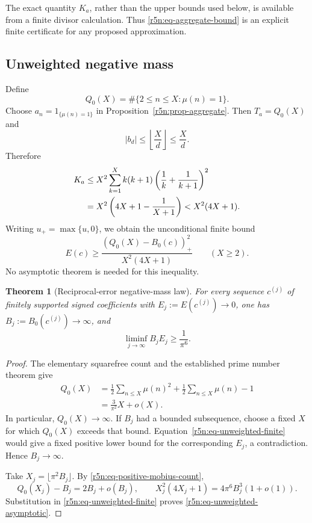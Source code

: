 \documentclass[11pt,a4paper]{article}
\newtheorem{theorem}{Theorem}[section]
\theoremstyle{definition}\newtheorem{definition}[theorem]{Definition}
\theoremstyle{remark}\newtheorem{remark}[theorem]{Remark}
\numberwithin{equation}{section}
\begin{document}
The exact quantity \(K_a\), rather than the upper bounds used below,
is available from a finite divisor calculation. Thus
\eqref{r5n:eq-aggregate-bound} is an explicit finite certificate
for any proposed approximation.

\subsection{Unweighted negative mass}
\label{r5n:subsec-unweighted}

Define
\[
 Q_0(X)=\#\{2\le n\le X:\mu(n)=1\}.
\]
Choose \(a_n=1_{\{\mu(n)=1\}}\) in
Proposition~\ref{r5n:prop-aggregate}. Then \(T_a=Q_0(X)\) and
\[
 |b_d|\le\left\lfloor\frac Xd\right\rfloor\le\frac Xd.
\]
Therefore
\begin{align}
\label{r5n:eq-unweighted-dual}
 K_a
 &\le X^2\sum_{k=1}^X k(k+1)
          \left(\frac1k+\frac1{k+1}\right)^2 \notag\\
 &=X^2\left(4X+1-\frac1{X+1}\right)
 <X^2(4X+1).
\end{align}
Writing \(u_+=\max\{u,0\}\), we obtain the unconditional finite bound
\begin{equation}
\label{r5n:eq-unweighted-finite}
 \boxed{
 E(c)\ge
 \frac{(Q_0(X)-B_0(c))_+^2}{X^2(4X+1)}
 \qquad(X\ge2).}
\end{equation}
No asymptotic theorem is needed for this inequality.

\begin{theorem}[Reciprocal-error negative-mass law]
\label{r5n:thm-unweighted-mass}
For every sequence \(c^{(j)}\) of finitely supported signed
coefficients with \(E_j:=E(c^{(j)})\to0\), one has
\(B_j:=B_0(c^{(j)})\to\infty\), and
\begin{equation}
\label{r5n:eq-unweighted-asymptotic}
 \liminf_{j\to\infty}B_jE_j\ge\frac1{\pi^6}.
\end{equation}
\end{theorem}

\begin{proof}
The elementary squarefree count and the established prime number
theorem give
\begin{equation}
\label{r5n:eq-positive-mobius-count}
 \begin{aligned}
 Q_0(X)
 &=\frac12\sum_{n\le X}\mu(n)^2
    +\frac12\sum_{n\le X}\mu(n)-1\\
 &=\frac3{\pi^2}X+o(X).
 \end{aligned}
\end{equation}
In particular, \(Q_0(X)\to\infty\). If \(B_j\) had a bounded
subsequence, choose a fixed \(X\) for which \(Q_0(X)\) exceeds
that bound. Equation~\eqref{r5n:eq-unweighted-finite} would give
a fixed positive lower bound for the corresponding \(E_j\),
a contradiction. Hence \(B_j\to\infty\).

Take \(X_j=\lfloor\pi^2B_j\rfloor\). By
\eqref{r5n:eq-positive-mobius-count},
\[
 Q_0(X_j)-B_j=2B_j+o(B_j),\qquad
 X_j^2(4X_j+1)=4\pi^6B_j^3(1+o(1)).
\]
Substitution in \eqref{r5n:eq-unweighted-finite} proves
\eqref{r5n:eq-unweighted-asymptotic}.
\end{proof}
\end{document}
